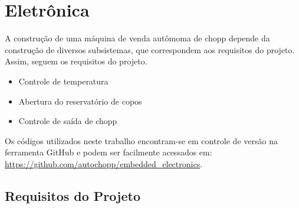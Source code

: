 \chapter[Eletrônica]{Eletrônica}


 
 A construção de uma máquina de venda autômoma de chopp depende da construção de diversos subsistemas,
 que correspondem aos requisitos do projeto. Assim, seguem os requisitos do projeto.

\begin{itemize}
\item Controle de temperatura
\item Abertura do reservatório de copos
\item Controle de saída de chopp
\end{itemize}
  
Os códigos utilizados neste trabalho encontram-se em controle de versão na ferramenta GitHub 
e podem ser facilmente acessados em: \url{https://github.com/autochopp/embedded_electronics}. 

\section{Requisitos do Projeto}

